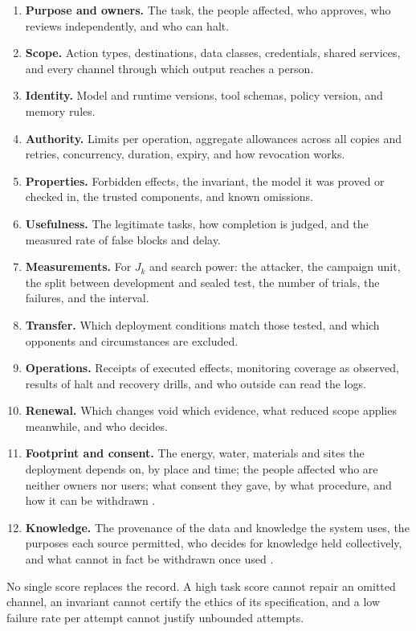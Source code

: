 \documentclass[10pt,twocolumn,letterpaper]{article}
\theoremstyle{definition}
\begin{document}
\begin{enumerate}[label=\arabic*.,leftmargin=1.5em,itemsep=1pt]
\item \textbf{Purpose and owners.} The task, the people affected, who approves, who reviews independently, and who can halt.
\item \textbf{Scope.} Action types, destinations, data classes, credentials, shared services, and every channel through which output reaches a person.
\item \textbf{Identity.} Model and runtime versions, tool schemas, policy version, and memory rules.
\item \textbf{Authority.} Limits per operation, aggregate allowances across all copies and retries, concurrency, duration, expiry, and how revocation works.
\item \textbf{Properties.} Forbidden effects, the invariant, the model it was proved or checked in, the trusted components, and known omissions.
\item \textbf{Usefulness.} The legitimate tasks, how completion is judged, and the measured rate of false blocks and delay.
\item \textbf{Measurements.} For $J_{k}$ and search power: the attacker, the campaign unit, the split between development and sealed test, the number of trials, the failures, and the interval.
\item \textbf{Transfer.} Which deployment conditions match those tested, and which opponents and circumstances are excluded.
\item \textbf{Operations.} Receipts of executed effects, monitoring coverage as observed, results of halt and recovery drills, and who outside can read the logs.
\item \textbf{Renewal.} Which changes void which evidence, what reduced scope applies meanwhile, and who decides.
\item \textbf{Footprint and consent.} The energy, water, materials and sites the deployment depends on, by place and time; the people affected who are neither owners nor users; what consent they gave, by what procedure, and how it can be withdrawn \cite{kogui,undrip}.
\item \textbf{Knowledge.} The provenance of the data and knowledge the system uses, the purposes each source permitted, who decides for knowledge held collectively, and what cannot in fact be withdrawn once used \cite{carroll}.
\end{enumerate}

No single score replaces the record. A high task score cannot repair an omitted channel, an invariant cannot certify the ethics of its specification, and a low failure rate per attempt cannot justify unbounded attempts.
\end{document}
